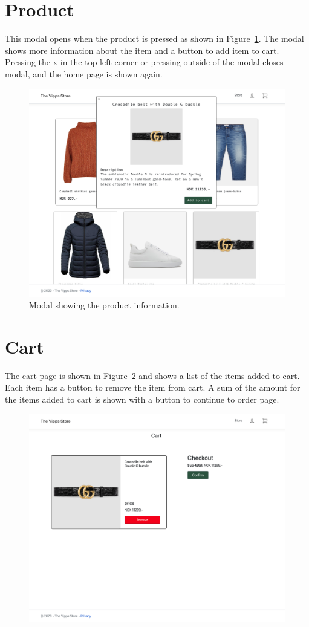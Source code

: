 \documentclass[11pt,a4paper,english]{article}
\begin{document}
\section*{Product}
This modal opens when the product is pressed as shown in Figure~\ref{fig:item}. The modal shows more information about the item and a button to add item to cart. Pressing the x in the top left corner or pressing outside of the modal closes modal, and the home page is shown again.
\begin{figure}[htbp]
  \centering
  \includegraphics[scale=0.2]{item}
  \caption{Modal showing the product information.}
  \label{fig:item}
\end{figure}
\section*{Cart}
The cart page is shown in Figure~\ref{fig:cart} and shows a list of the items added to cart. Each item has a button to remove the item from cart. A sum of the amount for the items added to cart is shown with a button to continue to order page.
\begin{figure}[htbp]
  \centering
  \includegraphics[scale=0.2]{cart}
  \caption{}
  \label{fig:cart}
\end{figure}
\end{document}
